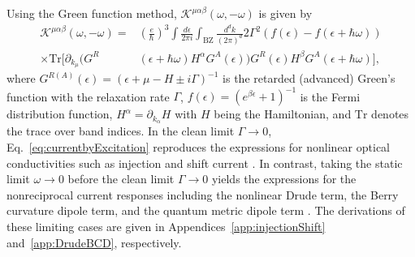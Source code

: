 \documentclass[twocolumn,superscriptaddress]{revtex4-1}
\begin{document}
Using the Green function method, $\mathcal{K}^{\mu\alpha\beta}(\omega,-\omega)$ is given by
\begin{align}
  \mathcal{K}^{\mu\alpha\beta}(\omega,-\omega)=&\left(\frac{e}{\hbar}\right)^3\int \frac{d\epsilon}{2\pi i}\int_{\mathrm{BZ}} \frac{d^d k}{(2\pi)^d} 2\Gamma^2 (f(\epsilon)-f(\epsilon+\hbar\omega)) \nonumber \\
  \times \mathrm{Tr} [\partial_{k_\mu} (G^R&(\epsilon+\hbar\omega) H^\alpha G^A(\epsilon) )G^R(\epsilon) H^\beta G^A(\epsilon+\hbar\omega)] ,\label{eq:currentbyExcitation}
\end{align}
where $G^{R(A)}(\epsilon)=(\epsilon+\mu-H\pm i\Gamma)^{-1}$ is the retarded (advanced) Green's function with the relaxation rate $\Gamma$, $f(\epsilon)=(e^{\beta \epsilon}+1)^{-1}$ is the Fermi distribution function, $H^\alpha=\partial_{k_\alpha} H$ with $H$ being the Hamiltonian, and $\mathrm{Tr}$ denotes the trace over band indices.
In the clean limit $\Gamma \to 0$, Eq.~\eqref{eq:currentbyExcitation} reproduces the expressions for nonlinear optical conductivities such as injection and shift current \cite{Sipe2000}. 
In contrast, taking the static limit $\omega \to 0$ before the clean limit $\Gamma \to 0$ yields the expressions for the nonreciprocal current responses including the nonlinear Drude term, the Berry curvature dipole term, and the quantum metric dipole term \cite{Ulrich2026}.
The derivations of these limiting cases are given in Appendices~\ref{app:injectionShift} and~\ref{app:DrudeBCD}, respectively.
\end{document}
